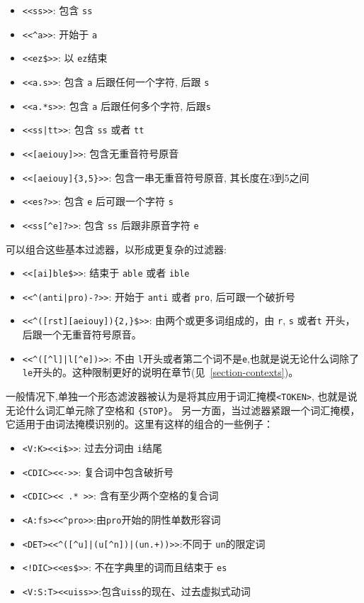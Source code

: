 \begin{itemize}
  \item \verb$<<ss>>$: 包含 \verb$ss$
  \item \verb$<<^a>>$: 开始于 \verb$a$
  \item \verb+<<ez$>>+: 以 \verb$ez$结束
  \item \verb$<<a.s>>$: 包含 \verb$a$ 后跟任何一个字符,  后跟 \verb$s$
  \item \verb$<<a.*s>>$: 包含 \verb$a$ 后跟任何多个字符, 后跟\verb$s$
  \item \verb$<<ss|tt>>$: 包含 \verb$ss$ 或者 \verb$tt$
  \item \verb$<<[aeiouy]>>$: 包含无重音符号原音
  \item \verb$<<[aeiouy]{3,5}>>$: 包含一串无重音符号原音, 其长度在3到5之间
  \item \verb$<<es?>>$: 包含 \verb$e$ 后可跟一个字符 \verb$s$ 
  \item \verb$<<ss[^e]?>>$: 包含 \verb$ss$ 后跟非原音字符 \verb$e$
\end{itemize}

\bigskip
\noindent 可以组合这些基本过滤器，以形成更复杂的过滤器:

\begin{itemize}
\item \verb+<<[ai]ble$>>+: 结束于 \verb$able$ 或者 \verb$ible$
\item \verb$<<^(anti|pro)-?>>$: 开始于 \verb$anti$ 或者 \verb$pro$, 后可跟一个破折号
  \item \verb+<<^([rst][aeiouy]){2,}$>>+: 由两个或更多词组成的，由 \verb$r$, \verb$s$ 或者\verb$t$
  开头，后跟一个无重音符号原音。
  \item \verb!<<^([^l]|l[^e])>>!: 不由 \verb$l$开头或者第二个词不是\verb$e$,也就是说无论什么词除了\verb$le$开头的。这种限制更好的说明在章节(见~\ref{section-contexts})。
\end{itemize}

\noindent 一般情况下,单独一个形态滤波器被认为是将其应用于词汇掩模\verb$<TOKEN>$, 也就是说无论什么词汇单元除了空格和
\verb+{STOP}+。
另一方面，当过滤器紧跟一个词汇掩模，它适用于由词法掩模识别的。这里有这样的组合的一些例子：



\begin{itemize}
  \item \verb+<V:K><<i$>>+: 过去分词由 \verb$i$结尾
  \item \verb!<CDIC><<->>!: 复合词中包含破折号
  \item \verb!<CDIC><< .* >>!: 含有至少两个空格的复合词
  \item \verb!<A:fs><<^pro>>!:由\verb$pro$开始的阴性单数形容词
  \item \verb!<DET><<^([^u]|(u[^n])|(un.+))>>!:不同于 \verb$un$的限定词
  \item \verb+<!DIC><<es$>>+: 不在字典里的词而且结束于
  \verb$es$
  \item \verb!<V:S:T><<uiss>>!:包含\verb$uiss$的现在、过去虚拟式动词
\end{itemize}

